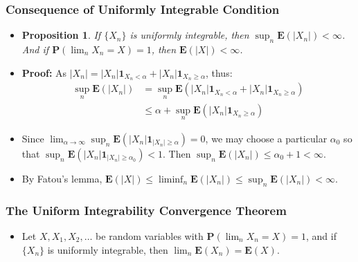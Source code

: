 \documentclass[handout]{beamer}
\newtheorem{Proposition}[theorem]{Proposition}%
\newcommand{\BP}{\mathbf{P}}
\newcommand{\BE}{\mathbf{E}}
\newcommand{\BI}{\mathbf{1}}
\begin{document}
\frame
{
  \frametitle{Consequence of Uniformly Integrable Condition} 

   \begin{itemize}
   
  
                \item<1->[] \begin{Proposition}  If $\{X_n\}$ is uniformly integrable, then $\sup_n \BE(|X_n|)<\infty$. And if $\BP(\lim_n X_n=X)=1$, then $\BE(|X|)<\infty$.

                 \end{Proposition}
                
                
                \item<2-> \textbf{Proof:} As $|X_n|=|X_n| \BI_{X_n<\alpha}+|X_n| \BI_{X_n\geq \alpha}$, thus:
                               \begin{align*} \sup_n \BE(|X_n|)& =\sup_n \BE(|X_n| \BI_{X_n<\alpha}+|X_n| \BI_{X_n\geq \alpha} ) \\ & \leq \alpha+\sup_n  \BE(|X_n| \BI_{X_n\geq \alpha} ) \end{align*}
                
                  \item<3->[-] Since $\lim_{\alpha\rightarrow \infty} \sup_n \BE(|X_n| \BI_{|X_n|\geq \alpha})=0$, we may choose a particular $\alpha_0$ so that $ \sup_n \BE(|X_n| \BI_{|X_n|\geq \alpha_0}) <1$. Then $ \sup_n \BE(|X_n|)\leq \alpha_0+1<\infty$. 
                  
                                    \item<4->[-] By Fatou's lemma, $\BE(|X|)\leq \liminf_n \BE(|X_n|)\leq \sup_n \BE(|X_n|) <\infty$.                                
                              \end{itemize}
}





\frame
{
  \frametitle{The Uniform Integrability Convergence Theorem} 

   \begin{itemize}
   
  
                \item<1->[] \begin{Theorem} Let $X, X_1, X_2, \ldots $ be random variables with $\BP(\lim_n X_n=X)=1$, and if  $\{X_n\}$ is uniformly integrable, then $\lim_n \BE(X_n)=\BE(X)$.\end{Theorem}
                                                                                                           
                              \end{itemize}
}
\end{document}
